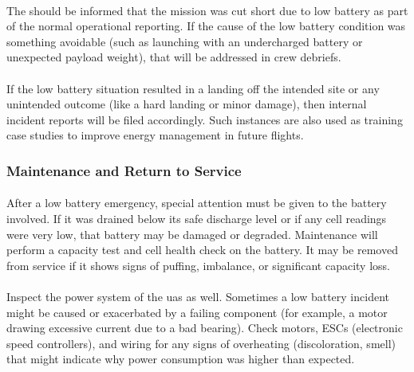                 \paragraph{} The  should be informed that the mission was cut short due to low battery as part of the normal operational reporting. If the cause of the low battery condition was something avoidable (such as launching with an undercharged battery or unexpected payload weight), that will be addressed in crew debriefs.
                
                \paragraph{} If the low battery situation resulted in a landing off the intended site or any unintended outcome (like a hard landing or minor damage), then internal incident reports will be filed accordingly. Such instances are also used as training case studies to improve energy management in future flights.
 
            \subsubsection{Maintenance and Return to Service}
            
                \paragraph{} After a low battery emergency, special attention must be given to the battery involved. If it was drained below its safe discharge level or if any cell readings were very low, that battery may be damaged or degraded. Maintenance will perform a capacity test and cell health check on the battery. It may be removed from service if it shows signs of puffing, imbalance, or significant capacity loss.
                
                \paragraph{} Inspect the power system of the \ac{uas} as well. Sometimes a low battery incident might be caused or exacerbated by a failing component (for example, a motor drawing excessive current due to a bad bearing). Check motors, ESCs (electronic speed controllers), and wiring for any signs of overheating (discoloration, smell) that might indicate why power consumption was higher than expected.
                
